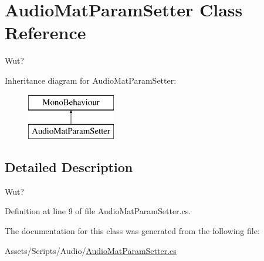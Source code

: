 \hypertarget{class_audio_mat_param_setter}{}\section{Audio\+Mat\+Param\+Setter Class Reference}
\label{class_audio_mat_param_setter}


Wut?  


Inheritance diagram for Audio\+Mat\+Param\+Setter\+:\begin{figure}[H]
\begin{center}
\leavevmode
\includegraphics[height=2.000000cm]{class_audio_mat_param_setter}
\end{center}
\end{figure}


\subsection{Detailed Description}
Wut? 



Definition at line 9 of file Audio\+Mat\+Param\+Setter.\+cs.



The documentation for this class was generated from the following file\+:\begin{DoxyCompactItemize}
\item 
Assets/\+Scripts/\+Audio/\mbox{\hyperlink{_audio_mat_param_setter_8cs}{Audio\+Mat\+Param\+Setter.\+cs}}\end{DoxyCompactItemize}
